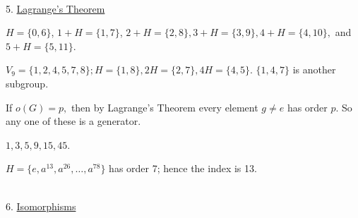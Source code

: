 \documentclass[12pt]{book}
\theoremstyle{definition}
\begin{document}
~\\[.1in]
{\Large 5. \underline{Lagrange's Theorem}}

\begin{oddenumerate}
	\item  $ H=\{0,6\} $, $ 1+H=\{1,7\} $, $ 2+H=\{2,8\}, 3+H=\{3,9\}, 4+H=\{4,10\}, $ and $ 5+H=\{5,11\}. $ 
	
	\item $ V_9=\{1,2,4,5,7,8\}; H=\{1,8\}, 2H=\{2,7\}, 4H=\{4,5\}$. $ \{1,4,7\} $ is another subgroup. 
	
	\item If $ o(G)=p, $ then by Lagrange's Theorem every element $ g\neq e $ has order $ p $. So any one of these is a generator. 
	
	\item $ 1,3,5,9,15,45. $
	
	\item $ H=\{e,a^{13}, a^{26},\dots ,a^{78}\} $ has order 7; hence the index is 13. 
	
	
\end{oddenumerate}

~\\[.1in]
{\Large 6. \underline{Isomorphisms}}
\end{document}
